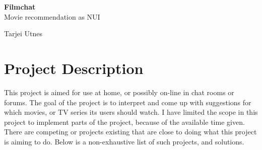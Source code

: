 \documentclass[11pt,fleqn]{book} %
\begin{document}

\begingroup
\thispagestyle{empty}
\centering
\vspace*{5cm}
\par\normalfont\fontsize{32}{32}\sffamily\selectfont
\textbf{Filmchat}\\
{\LARGE Movie recommendation as NUI}\par %
\vspace*{1cm}
{\Huge Tarjei Utnes}\par %
\endgroup



\pagestyle{empty} %

\tableofcontents %


\pagestyle{fancy} %



\chapter{Project Description}
This project is aimed for use at home, or possibly on-line in chat rooms or forums. The goal of the project is to interpret and come up with suggestions for which movies, or TV series its users should watch. I have limited the scope in this project to implement parts of the project, because of the available time given.
There are competing or projects existing that are close to doing what this project is aiming to do. Below is a non-exhaustive list of such projects, and solutions.
\end{document}
